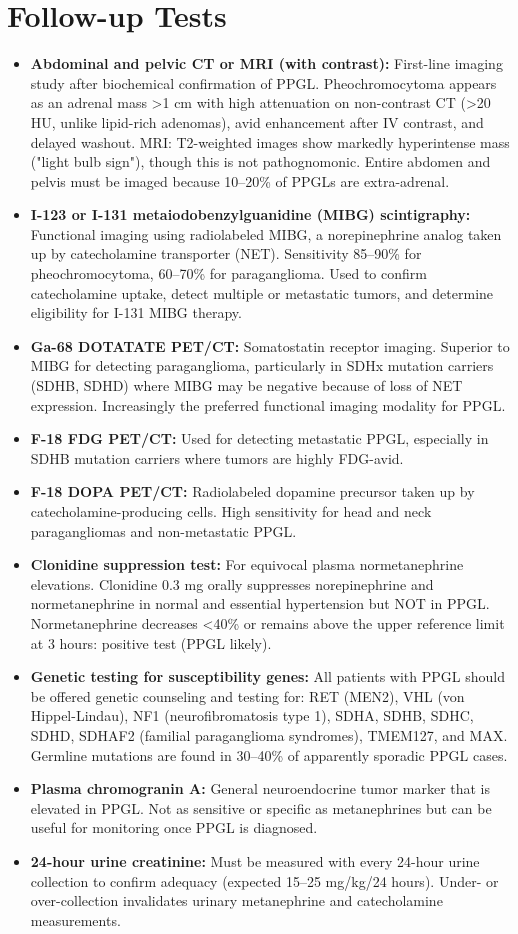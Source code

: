 \section*{Follow-up Tests}
\begin{itemize}
  \item \textbf{Abdominal and pelvic CT or MRI (with contrast):} First-line imaging study after biochemical confirmation of PPGL. Pheochromocytoma appears as an adrenal mass >1 cm with high attenuation on non-contrast CT (>20 HU, unlike lipid-rich adenomas), avid enhancement after IV contrast, and delayed washout. MRI: T2-weighted images show markedly hyperintense mass ("light bulb sign"), though this is not pathognomonic. Entire abdomen and pelvis must be imaged because 10--20\% of PPGLs are extra-adrenal.
  \item \textbf{I-123 or I-131 metaiodobenzylguanidine (MIBG) scintigraphy:} Functional imaging using radiolabeled MIBG, a norepinephrine analog taken up by catecholamine transporter (NET). Sensitivity 85--90\% for pheochromocytoma, 60--70\% for paraganglioma. Used to confirm catecholamine uptake, detect multiple or metastatic tumors, and determine eligibility for I-131 MIBG therapy.
  \item \textbf{Ga-68 DOTATATE PET/CT:} Somatostatin receptor imaging. Superior to MIBG for detecting paraganglioma, particularly in SDHx mutation carriers (SDHB, SDHD) where MIBG may be negative because of loss of NET expression. Increasingly the preferred functional imaging modality for PPGL.
  \item \textbf{F-18 FDG PET/CT:} Used for detecting metastatic PPGL, especially in SDHB mutation carriers where tumors are highly FDG-avid.
  \item \textbf{F-18 DOPA PET/CT:} Radiolabeled dopamine precursor taken up by catecholamine-producing cells. High sensitivity for head and neck paragangliomas and non-metastatic PPGL.
  \item \textbf{Clonidine suppression test:} For equivocal plasma normetanephrine elevations. Clonidine 0.3 mg orally suppresses norepinephrine and normetanephrine in normal and essential hypertension but NOT in PPGL. Normetanephrine decreases <40\% or remains above the upper reference limit at 3 hours: positive test (PPGL likely).
  \item \textbf{Genetic testing for susceptibility genes:} All patients with PPGL should be offered genetic counseling and testing for: RET (MEN2), VHL (von Hippel-Lindau), NF1 (neurofibromatosis type 1), SDHA, SDHB, SDHC, SDHD, SDHAF2 (familial paraganglioma syndromes), TMEM127, and MAX. Germline mutations are found in 30--40\% of apparently sporadic PPGL cases.
  \item \textbf{Plasma chromogranin A:} General neuroendocrine tumor marker that is elevated in PPGL. Not as sensitive or specific as metanephrines but can be useful for monitoring once PPGL is diagnosed.
  \item \textbf{24-hour urine creatinine:} Must be measured with every 24-hour urine collection to confirm adequacy (expected 15--25 mg/kg/24 hours). Under- or over-collection invalidates urinary metanephrine and catecholamine measurements.
\end{itemize}

